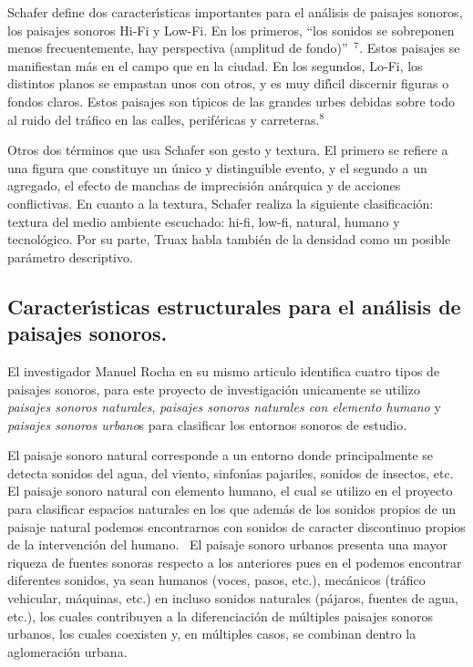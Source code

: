 Schafer define dos caracter\'{\i}sticas importantes para el an\'{a}lisis de
paisajes sonoros, los paisajes sonoros Hi-Fi y Low-Fi. En los primeros,
\textquotedblleft los sonidos se sobreponen menos frecuentemente, hay
perspectiva (amplitud de fondo)\textquotedblright\ $^{7}$. Estos paisajes se
manifiestan m\'{a}s en el campo que en la ciudad. En los segundos, Lo-Fi, los
distintos planos se empastan unos con otros, y es muy dif\'{\i}cil discernir
figuras o fondos claros. Estos paisajes son t\'{\i}picos de las grandes urbes
debidas sobre todo al ruido del tr\'{a}fico en las calles, perif\'{e}ricas y
carreteras.$^{8}$

Otros dos t\'{e}rminos que usa Schafer son gesto y textura. El primero se
refiere a una figura que constituye un \'{u}nico y distinguible evento, y el
segundo a un agregado, el efecto de manchas de imprecisi\'{o}n an\'{a}rquica y
de acciones conflictivas. En cuanto a la textura, Schafer realiza la siguiente
clasificaci\'{o}n: textura del medio ambiente escuchado: hi-fi, low-fi,
natural, humano y tecnol\'{o}gico. Por su parte, Truax habla tambi\'{e}n de la
densidad como un posible par\'{a}metro descriptivo.

\subsection{Caracter\'{\i}sticas estructurales para el an\'{a}lisis de
paisajes sonoros. }

El investigador Manuel Rocha en su mismo articulo identifica cuatro tipos de
paisajes sonoros, para este proyecto de investigaci\'{o}n unicamente se
utilizo \textit{paisajes sonoros naturales}, \textit{paisajes sonoros
naturales con elemento humano} y \textit{paisajes sonoros urbano}s para
clasificar los entornos sonoros de estudio.

El paisaje sonoro natural corresponde a un entorno donde principalmente se
detecta sonidos del agua, del viento, sinfon\'{\i}as pajariles, sonidos de
insectos, etc. El paisaje sonoro natural con elemento humano, el cual se
utilizo en el proyecto para clasificar espacios naturales en los que
adem\'{a}s de los sonidos propios de un paisaje natural podemos encontrarnos
con sonidos de caracter discontinuo propios de la intervenci\'{o}n del humano.
\ El paisaje sonoro urbanos presenta una mayor riqueza de fuentes sonoras
respecto a los anteriores pues en el podemos encontrar diferentes sonidos, ya
sean humanos (voces, pasos, etc.), mec\'{a}nicos (tr\'{a}fico vehicular,
m\'{a}quinas, etc.) en incluso sonidos naturales (p\'{a}jaros, fuentes de
agua, etc.), los cuales contribuyen a la diferenciaci\'{o}n de m\'{u}ltiples
paisajes sonoros urbanos, los cuales coexisten y, en m\'{u}ltiples casos, se
combinan dentro la aglomeraci\'{o}n urbana.

